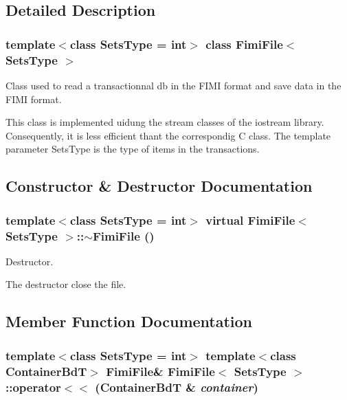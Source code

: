 \subsection{Detailed Description}
\subsubsection*{template$<$class Sets\-Type = int$>$ class Fimi\-File$<$ Sets\-Type $>$}

Class used to read a transactionnal db in the FIMI format and save data in the FIMI format. 

This class is implemented uidung the stream classes of the iostream library. Consequently, it is less efficient thant the correspondig C class. The template parameter Sets\-Type is the type of items in the transactions. 



\subsection{Constructor \& Destructor Documentation}
\subsubsection{\setlength{\rightskip}{0pt plus 5cm}template$<$class Sets\-Type = int$>$ virtual {\bf Fimi\-File}$<$ Sets\-Type $>$::$\sim${\bf Fimi\-File} ()\hspace{0.3cm}{\tt  [inline, virtual]}}\label{class_fimi_file_755603ee01f5dbb89246a62211bdd63f}


Destructor. 

The destructor close the file. 

\subsection{Member Function Documentation}
\subsubsection{\setlength{\rightskip}{0pt plus 5cm}template$<$class Sets\-Type = int$>$ template$<$class Container\-Bd\-T$>$ {\bf Fimi\-File}\& {\bf Fimi\-File}$<$ Sets\-Type $>$::operator$<$$<$ (Container\-Bd\-T \& {\em container})\hspace{0.3cm}{\tt  [inline]}}\label{class_fimi_file_79e4b235b956e9a1965176be3672a6ce}


